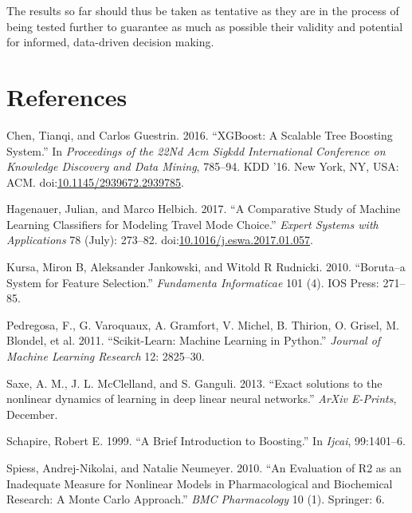 \documentclass[11pt]{article}
\begin{document}
The results so far should thus be taken as tentative as they are in the
process of being tested further to guarantee as much as possible their
validity and potential for informed, data-driven decision making.

\section*{References}\label{references}

\hypertarget{refs}{}
\hypertarget{ref-Chen:2016:XST:2939672.2939785}{}
Chen, Tianqi, and Carlos Guestrin. 2016. ``XGBoost: A Scalable Tree
Boosting System.'' In \emph{Proceedings of the 22Nd Acm Sigkdd
International Conference on Knowledge Discovery and Data Mining},
785--94. KDD '16. New York, NY, USA: ACM.
doi:\href{https://doi.org/10.1145/2939672.2939785}{10.1145/2939672.2939785}.

\hypertarget{ref-hagenauer_comparative_2017}{}
Hagenauer, Julian, and Marco Helbich. 2017. ``A Comparative Study of
Machine Learning Classifiers for Modeling Travel Mode Choice.''
\emph{Expert Systems with Applications} 78 (July): 273--82.
doi:\href{https://doi.org/10.1016/j.eswa.2017.01.057}{10.1016/j.eswa.2017.01.057}.

\hypertarget{ref-kursa2010boruta}{}
Kursa, Miron B, Aleksander Jankowski, and Witold R Rudnicki. 2010.
``Boruta--a System for Feature Selection.'' \emph{Fundamenta
Informaticae} 101 (4). IOS Press: 271--85.

\hypertarget{ref-scikit-learn}{}
Pedregosa, F., G. Varoquaux, A. Gramfort, V. Michel, B. Thirion, O.
Grisel, M. Blondel, et al. 2011. ``Scikit-Learn: Machine Learning in
Python.'' \emph{Journal of Machine Learning Research} 12: 2825--30.

\hypertarget{ref-2013arXiv1312.6120S}{}
Saxe, A. M., J. L. McClelland, and S. Ganguli. 2013. ``Exact solutions
to the nonlinear dynamics of learning in deep linear neural networks.''
\emph{ArXiv E-Prints}, December.

\hypertarget{ref-schapire1999brief}{}
Schapire, Robert E. 1999. ``A Brief Introduction to Boosting.'' In
\emph{Ijcai}, 99:1401--6.

\hypertarget{ref-spiess2010evaluation}{}
Spiess, Andrej-Nikolai, and Natalie Neumeyer. 2010. ``An Evaluation of
R2 as an Inadequate Measure for Nonlinear Models in Pharmacological and
Biochemical Research: A Monte Carlo Approach.'' \emph{BMC Pharmacology}
10 (1). Springer: 6.
\end{document}
